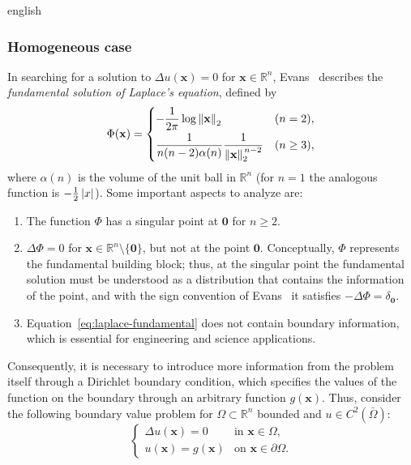\begin{hyphenrules}{english}
\subsubsection{Homogeneous case}
In searching for a solution to $\Delta u(\mathbf{x})=0$ for $\mathbf{x}\in\mathbb{R}^n$, Evans~\cite{evans2010} describes the
\emph{fundamental solution of Laplace's equation}, defined by
\begin{equation}
  \Phi(\mathbf{x})=
  \begin{cases}
    -\dfrac{1}{2\pi}\log\left\lVert \mathbf{x} \right\rVert_2 & (n=2),\\[2mm]
    \dfrac{1}{n(n-2)\alpha(n)}\dfrac{1}{\left\lVert \mathbf{x} \right\rVert_2^{\,n-2}} & (n\ge3),
  \end{cases}
  \label{eq:laplace-fundamental}
\end{equation}
where $\alpha(n)$ is the volume of the unit ball in $\mathbb{R}^n$ (for $n=1$ the analogous function is
$-\tfrac12\left\lvert x \right\rvert$). Some important aspects to analyze are:
\begin{enumerate}
  \item The function $\Phi$ has a singular point at $\mathbf{0}$ for $n\ge2$.
  \item $\Delta\Phi=0$ for $\mathbf{x}\in\mathbb{R}^n\setminus\{\mathbf{0}\}$, but not at the point $\mathbf{0}$.
    Conceptually, $\Phi$ represents the fundamental building block; thus, at the singular point the
    fundamental solution must be understood as a distribution that contains the information of the
    point, and with the sign convention of Evans~\cite{evans2010} it satisfies $-\Delta\Phi=\delta_{\mathbf{0}}$.
  \item Equation~\eqref{eq:laplace-fundamental} does not contain boundary information, which is essential for
    engineering and science applications.
\end{enumerate}

Consequently, it is necessary to introduce more information from the problem itself through a
Dirichlet boundary condition, which specifies the values of the function on the boundary through an
arbitrary function $g(\mathbf{x})$. Thus, consider the following boundary value problem for
$\Omega\subset\mathbb{R}^n$ bounded and $u\in C^2(\bar\Omega)$:
\begin{equation}
  \begin{cases}
    \Delta u(\mathbf{x})=0 & \text{in } \mathbf{x}\in\Omega,\\
    u(\mathbf{x})=g(\mathbf{x}) & \text{on } \mathbf{x}\in\partial\Omega.
  \end{cases}
  \label{eq:laplace-dirichlet}
\end{equation}


\end{hyphenrules}
